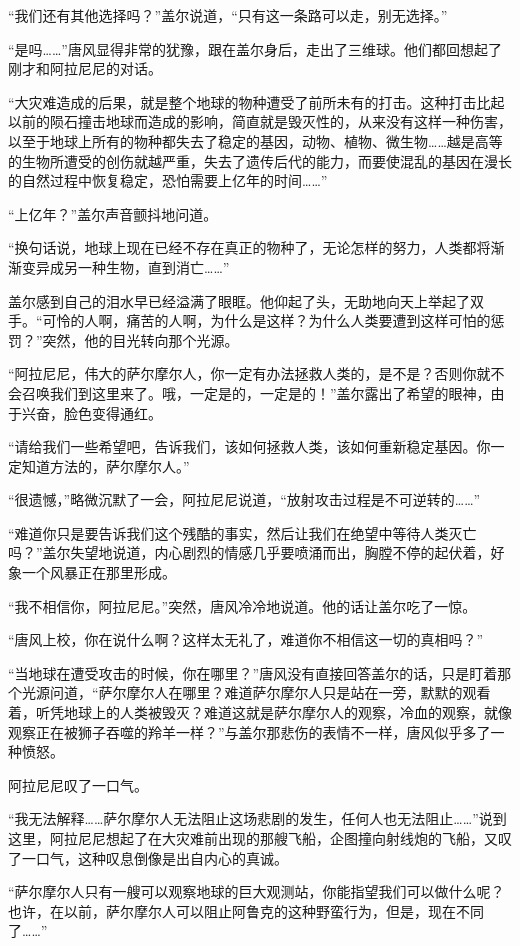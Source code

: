 “我们还有其他选择吗？”盖尔说道，“只有这一条路可以走，别无选择。”

“是吗……”唐风显得非常的犹豫，跟在盖尔身后，走出了三维球。他们都回想起了刚才和阿拉尼尼的对话。

“大灾难造成的后果，就是整个地球的物种遭受了前所未有的打击。这种打击比起以前的陨石撞击地球而造成的影响，简直就是毁灭性的，从来没有这样一种伤害，以至于地球上所有的物种都失去了稳定的基因，动物、植物、微生物……越是高等的生物所遭受的创伤就越严重，失去了遗传后代的能力，而要使混乱的基因在漫长的自然过程中恢复稳定，恐怕需要上亿年的时间……”

“上亿年？”盖尔声音颤抖地问道。

“换句话说，地球上现在已经不存在真正的物种了，无论怎样的努力，人类都将渐渐变异成另一种生物，直到消亡……”

盖尔感到自己的泪水早已经溢满了眼眶。他仰起了头，无助地向天上举起了双手。“可怜的人啊，痛苦的人啊，为什么是这样？为什么人类要遭到这样可怕的惩罚？”突然，他的目光转向那个光源。

“阿拉尼尼，伟大的萨尔摩尔人，你一定有办法拯救人类的，是不是？否则你就不会召唤我们到这里来了。哦，一定是的，一定是的！”盖尔露出了希望的眼神，由于兴奋，脸色变得通红。

“请给我们一些希望吧，告诉我们，该如何拯救人类，该如何重新稳定基因。你一定知道方法的，萨尔摩尔人。”

“很遗憾，”略微沉默了一会，阿拉尼尼说道，“放射攻击过程是不可逆转的……”

“难道你只是要告诉我们这个残酷的事实，然后让我们在绝望中等待人类灭亡吗？”盖尔失望地说道，内心剧烈的情感几乎要喷涌而出，胸膛不停的起伏着，好象一个风暴正在那里形成。

“我不相信你，阿拉尼尼。”突然，唐风冷冷地说道。他的话让盖尔吃了一惊。

“唐风上校，你在说什么啊？这样太无礼了，难道你不相信这一切的真相吗？”

“当地球在遭受攻击的时候，你在哪里？”唐风没有直接回答盖尔的话，只是盯着那个光源问道，“萨尔摩尔人在哪里？难道萨尔摩尔人只是站在一旁，默默的观看着，听凭地球上的人类被毁灭？难道这就是萨尔摩尔人的观察，冷血的观察，就像观察正在被狮子吞噬的羚羊一样？”与盖尔那悲伤的表情不一样，唐风似乎多了一种愤怒。

阿拉尼尼叹了一口气。

“我无法解释……萨尔摩尔人无法阻止这场悲剧的发生，任何人也无法阻止……”说到这里，阿拉尼尼想起了在大灾难前出现的那艘飞船，企图撞向射线炮的飞船，又叹了一口气，这种叹息倒像是出自内心的真诚。

“萨尔摩尔人只有一艘可以观察地球的巨大观测站，你能指望我们可以做什么呢？也许，在以前，萨尔摩尔人可以阻止阿鲁克的这种野蛮行为，但是，现在不同了……”


